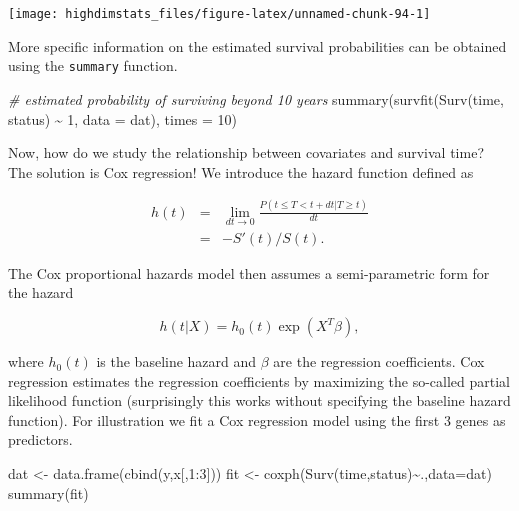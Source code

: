 \documentclass[
]{book}
\newenvironment{Shaded}{\begin{snugshade}}{\end{snugshade}}
\newcommand{\AttributeTok}[1]{\textcolor[rgb]{0.77,0.63,0.00}{#1}}
\newcommand{\CommentTok}[1]{\textcolor[rgb]{0.56,0.35,0.01}{\textit{#1}}}
\newcommand{\DecValTok}[1]{\textcolor[rgb]{0.00,0.00,0.81}{#1}}
\newcommand{\FunctionTok}[1]{\textcolor[rgb]{0.00,0.00,0.00}{#1}}
\newcommand{\NormalTok}[1]{#1}
\newcommand{\OtherTok}[1]{\textcolor[rgb]{0.56,0.35,0.01}{#1}}
\newcommand{\SpecialCharTok}[1]{\textcolor[rgb]{0.00,0.00,0.00}{#1}}
\begin{document}
\begin{center}\texttt{[image: highdimstats\_files/figure-latex/unnamed-chunk-94-1]} \end{center}

More specific information on the estimated survival probabilities can be obtained using the \texttt{summary} function.

\begin{Shaded}
\begin{Highlighting}[]
\CommentTok{\# estimated probability of surviving beyond 10 years}
\FunctionTok{summary}\NormalTok{(}\FunctionTok{survfit}\NormalTok{(}\FunctionTok{Surv}\NormalTok{(time, status) }\SpecialCharTok{\textasciitilde{}} \DecValTok{1}\NormalTok{, }\AttributeTok{data =}\NormalTok{ dat), }\AttributeTok{times =} \DecValTok{10}\NormalTok{)}
\end{Highlighting}
\end{Shaded}

Now, how do we study the relationship between covariates and survival time? The solution is Cox regression! We introduce the hazard function defined as

\begin{eqnarray*}
h(t)&=&\lim_{dt\rightarrow 0}\frac{P(t\leq T < t+dt|T\geq t)}{dt}\\
&=&-S'(t)/S(t).
\end{eqnarray*}

The Cox proportional hazards model then assumes a semi-parametric form for the hazard

\[h(t|X)=h_0(t)\exp(X^T\beta),\]

where \(h_0(t)\) is the baseline hazard and \(\beta\) are the regression coefficients. Cox regression estimates the regression coefficients by maximizing the so-called partial likelihood function (surprisingly this works without specifying the baseline hazard function). For illustration we fit a Cox regression model using the first 3 genes as predictors.

\begin{Shaded}
\begin{Highlighting}[]
\NormalTok{dat }\OtherTok{\textless{}{-}} \FunctionTok{data.frame}\NormalTok{(}\FunctionTok{cbind}\NormalTok{(y,x[,}\DecValTok{1}\SpecialCharTok{:}\DecValTok{3}\NormalTok{]))}
\NormalTok{fit }\OtherTok{\textless{}{-}} \FunctionTok{coxph}\NormalTok{(}\FunctionTok{Surv}\NormalTok{(time,status)}\SpecialCharTok{\textasciitilde{}}\NormalTok{.,}\AttributeTok{data=}\NormalTok{dat)}
\FunctionTok{summary}\NormalTok{(fit)}
\end{Highlighting}
\end{Shaded}
\end{document}
